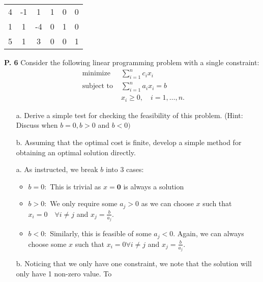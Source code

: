 \documentclass{article}
\begin{document}
\begin{jacklist}
\begin{itemize}
\begin{center}
\begin{tabular}{|c|ccccc|}
                    \hline
                    4&-1&1&1&0&0\\
                    1&1&-4&0&1&0\\
                    5&1&3&0&0&1\\
                    \hline
                \end{tabular}
            \end{center}
    \end{itemize}
\newpage
    \begin{framed} 
    \item [\textbf{P. 6}] Consider the following linear programming problem with a single constraint: 
    \[ 
        \begin{aligned}
            \text { minimize } & \sum_{i=1}^{n} c_{i} x_{i} \\
            \text { subject to } & \sum_{i=1}^{n} a_{i} x_{i}=b \\
            & x_{i} \geq 0, \quad i=1, \ldots, n .
        \end{aligned}
    \] 
    \begin{itemize}
        \item [a.] Derive a simple test for checking the feasibility of this problem. (Hint: Discuss when $b=0, b>0$ and $b<0)$ 
        \item [b.] Assuming that the optimal cost is finite, develop a simple method for obtaining an optimal solution directly.
    \end{itemize}
    \end{framed}
    \begin{itemize}
        \item [a.] As instructed, we break $b$ into 3 cases: \\
            \begin{itemize}
                \item $b = 0:$ This is trivial as $x = \textbf{0}$ is always a solution 
                \item $b > 0:$ We only require some $a_j > 0$ as we can choose $x$ such that $x_i = 0 \quad \forall i \neq j$ and 
                    $x_j = \frac{b}{a_j}$. 
                \item $b < 0:$ Similarly, this is feasible of some $a_j < 0$. Again, we can always choose some $x$ such that
                    $x_i = 0 \forall i \neq j$ and $x_j = \frac{b}{a_j}$. 
            \end{itemize}
        \item [b.] Noticing that we only have one constraint, we note that the solution will only have 1 non-zero value. To 

\end{itemize}
\end{jacklist}
\end{document}
